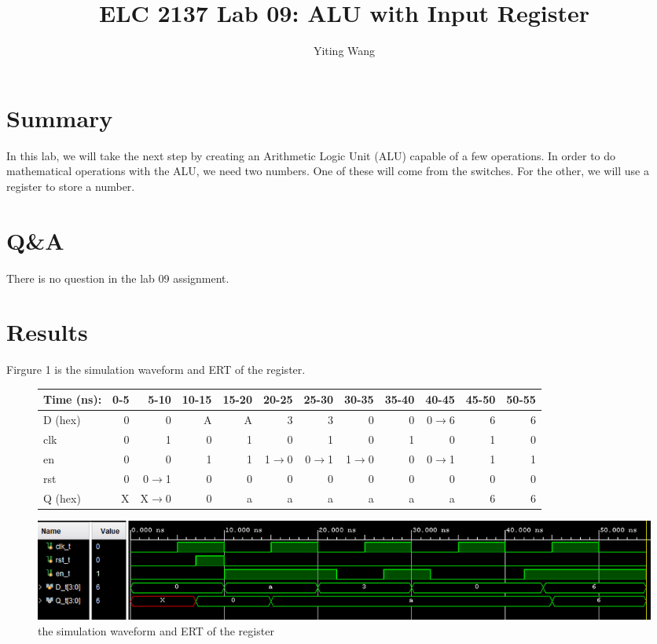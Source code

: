 \documentclass[11pt]{article}
\begin{document}
\title{ELC 2137 Lab 09: ALU with Input Register}
\author{Yiting Wang}

\maketitle


\section*{Summary}

In this lab, we will take the next step by creating an Arithmetic Logic Unit (ALU) capable of a few operations. In order to do mathematical operations with the ALU, we need two numbers. One of these will come from the switches. For the other, we will use a register to store a number.\\


\section*{Q\&A}

There is no question in the lab 09 assignment.\\


\section*{Results}


Firgure 1 is the simulation waveform and ERT of the register.\\
\begin{figure}[ht]\centering
	\begin{tabular}{l|rrrrrrrrrrr}
		Time (ns): & 0-5 & 5-10 & 10-15 & 15-20 & 20-25 & 25-30 & 30-35 & 35-40 & 40-45 & 45-50 & 50-55 \\
		\midrule
		D (hex) & 0 & 0 	  & A & A & 3 	    & 3 	  & 0 	    & 0 & 0$\to$6 & 6 & 6 \\
		clk     & 0 & 1 	  & 0 & 1 & 0 	    & 1 	  & 0 	    & 1 & 0 	  & 1 & 0 \\
		en  	& 0 & 0 	  & 1 & 1 & 1$\to$0 & 0$\to$1 & 1$\to$0 & 0 & 0$\to$1 & 1 & 1 \\
		rst 	& 0 & 0$\to$1 & 0 & 0 & 0 		& 0 	  & 0		& 0 & 0		  & 0 & 0 \\
		\midrule
		Q (hex) & X & X$\to$0 & 0 & a & a & a & a & a & a & 6 & 6 \\
		\bottomrule
	\end{tabular}\medskip
	
	\includegraphics[width=1\textwidth]{register_simulation}
	\caption{the simulation waveform and ERT of the register}
	\label{fig:register_simulation}
\end{figure}
\end{document}
